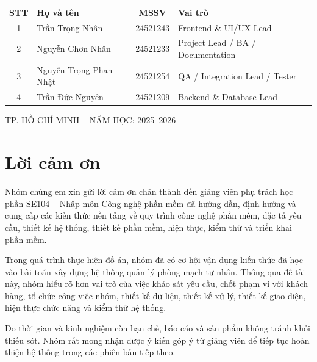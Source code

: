 \documentclass[12pt,a4paper,oneside]{report}
\newcommand{\coursename}{SE104 -- Nhập môn Công nghệ phần mềm}
\begin{document}
\begin{titlepage}
    \vspace{0.75cm}

    \begin{tabularx}{0.84\textwidth}{@{}c X c X@{}}
        \textbf{STT} & \textbf{Họ và tên} & \textbf{MSSV} & \textbf{Vai trò} \\[0.2cm]

        1 & Trần Trọng Nhân & 24521243 & Frontend \& UI/UX Lead \\[0.18cm]

        2 & Nguyễn Chơn Nhân & 24521233 & Project Lead / BA / Documentation \\[0.18cm]

        3 & Nguyễn Trọng Phan Nhật & 24521254 & QA / Integration Lead / Tester \\[0.18cm]

        4 & Trần Đức Nguyên & 24521209 & Backend \& Database Lead \\
    \end{tabularx}

    \vfill

    {\normalsize TP. HỒ CHÍ MINH -- NĂM HỌC: 2025--2026}

\end{titlepage}

\cleardoublepage


\cleardoublepage %

\chapter*{Lời cảm ơn}
Nhóm chúng em xin gửi lời cảm ơn chân thành đến giảng viên phụ trách học phần \coursename{} đã hướng dẫn, định hướng và cung cấp các kiến thức nền tảng về quy trình công nghệ phần mềm, đặc tả yêu cầu, thiết kế hệ thống, thiết kế phần mềm, hiện thực, kiểm thử và triển khai phần mềm.

Trong quá trình thực hiện đồ án, nhóm đã có cơ hội vận dụng kiến thức đã học vào bài toán xây dựng hệ thống quản lý phòng mạch tư nhân. Thông qua đề tài này, nhóm hiểu rõ hơn vai trò của việc khảo sát yêu cầu, chốt phạm vi với khách hàng, tổ chức công việc nhóm, thiết kế dữ liệu, thiết kế xử lý, thiết kế giao diện, hiện thực chức năng và kiểm thử hệ thống.

Do thời gian và kinh nghiệm còn hạn chế, báo cáo và sản phẩm không tránh khỏi thiếu sót. Nhóm rất mong nhận được ý kiến góp ý từ giảng viên để tiếp tục hoàn thiện hệ thống trong các phiên bản tiếp theo.



\tableofcontents
\listoffigures
\listoftables
\clearpage
{}










\nocite{*}



\appendix

\end{document}
